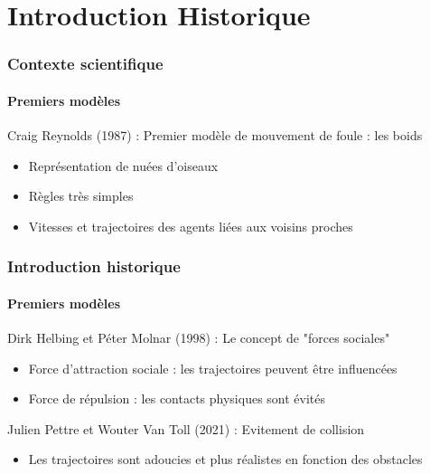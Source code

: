 \section{Introduction Historique}

\begin{frame}
    \frametitle{Contexte scientifique }
    \framesubtitle{Premiers modèles}

    Craig Reynolds (1987) : Premier modèle de mouvement de foule : les boids

    \begin{itemize}
        \item	<2->	Représentation de nuées d’oiseaux
        \item	<3->	Règles très simples
        \item   <4->      Vitesses et trajectoires des agents liées aux voisins proches


    \end{itemize}

\end{frame}


\begin{frame}
    \frametitle{Introduction historique}
    \framesubtitle{Premiers modèles}

    Dirk Helbing et Péter Molnar (1998) : Le concept de "forces sociales"

    \begin{itemize}
        \item	<2->	Force d’attraction sociale : les trajectoires peuvent être influencées

        \item	<3->	Force de répulsion : les contacts physiques sont évités
    \end{itemize}
    \bigskip
     Julien Pettre et Wouter Van Toll (2021) : Evitement de collision

    \begin{itemize}
        \item <5-> Les trajectoires sont adoucies et plus réalistes en fonction des obstacles
    \end{itemize}

\end{frame}


